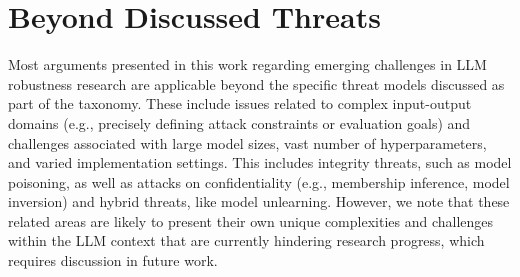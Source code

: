 




\section{Beyond Discussed Threats}
Most arguments presented in this work regarding emerging challenges in LLM robustness research are applicable beyond the specific threat models discussed as part of the taxonomy. 
These include issues related to complex input-output domains (e.g., precisely defining attack constraints or evaluation goals) and challenges associated with large model sizes, vast number of hyperparameters, and varied implementation settings.
This includes integrity threats, such as model poisoning, as well as attacks on confidentiality (e.g., membership inference, model inversion) and hybrid threats, like model unlearning. 
However, we note that these related areas are likely to present their own unique complexities and challenges within the LLM context that are currently hindering research progress, which requires discussion in future work.
\vspace{-10pt}
